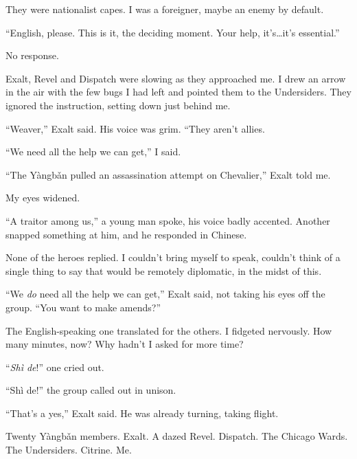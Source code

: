 They were nationalist capes.  I was a foreigner, maybe an enemy by default.



``English, please.  This is it, the deciding moment.  Your help, it's\ldots it's essential.''



No response.



Exalt, Revel and Dispatch were slowing as they approached me.  I drew an arrow in the air with the few bugs I had left and pointed them to the Undersiders.  They ignored the instruction, setting down just behind me.



``Weaver,'' Exalt said.  His voice was grim.  ``They aren't allies.



``We need all the help we can get,'' I said.



``The Y\`{a}ngb\v{a}n pulled an assassination attempt on Chevalier,'' Exalt told me.



My eyes widened.



``A traitor among us,'' a young man spoke, his voice badly accented.  Another snapped something at him, and he responded in Chinese.



None of the heroes replied.  I couldn't bring myself to speak, couldn't think of a single thing to say that would be remotely diplomatic, in the midst of this.



``We \emph{do} need all the help we can get,'' Exalt said, not taking his eyes off the group.  ``You want to make amends?''



The English-speaking one translated for the others.  I fidgeted nervously.  How many minutes, now?  Why hadn't I asked for more time?



``\emph{Sh\`{i} de}!'' one cried out.



``Sh\`{i} de!'' the group called out in unison.



``That's a yes,'' Exalt said.  He was already turning, taking flight.



Twenty Y\`{a}ngb\v{a}n members.  Exalt.  A dazed Revel.  Dispatch.  The Chicago Wards.  The Undersiders.  Citrine.  Me.



